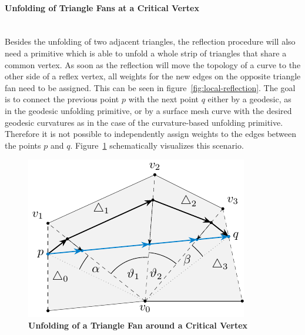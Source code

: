 \documentclass{stdlocal}
\begin{document}
  \paragraph{Unfolding of Triangle Fans at a Critical Vertex}\hfill\\
  Besides the unfolding of two adjacent triangles, the reflection procedure will also need a primitive which is able to unfold a whole strip of triangles that share a common vertex.
  As soon as the reflection will move the topology of a curve to the other side of a reflex vertex, all weights for the new edges on the opposite triangle fan need to be assigned.
  This can be seen in figure~\ref{fig:local-reflection}.
  The goal is to connect the previous point $p$ with the next point $q$ either by a geodesic, as in the geodesic unfolding primitive, or by a surface mesh curve with the desired geodesic curvatures as in the case of the curvature-based unfolding primitive.
  Therefore it is not possible to independently assign weights to the edges between the points $p$ and $q$.
  Figure~\ref{fig:unfolding-critical-vertex} schematically visualizes this scenario.

  \begin{figure}
    \centering
    \includegraphics[width=0.55\linewidth]{figures/unfolding-critical-vertex.pdf}
    \caption[Unfolding of a Triangle Fan around a Critical Vertex]{%
      \textbf{Unfolding of a Triangle Fan around a Critical Vertex}\\
    }
    \label{fig:unfolding-critical-vertex}
  \end{figure}
\end{document}
